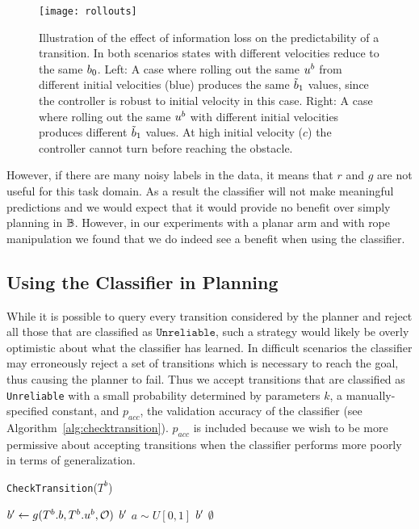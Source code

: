 \begin{figure}[h]
    \centering
    \texttt{[image: rollouts]}
    \caption{Illustration of the effect of information loss on the predictability of a transition. In both scenarios states with different velocities reduce to the same $b_0$. Left: A case where rolling out the same $u^b$ from different initial velocities (blue) produces the same $\tilde{b}_1$ values, since the controller is robust to initial velocity in this case. Right: A case where rolling out the same $u^b$ with different initial velocities produces different $\tilde{b}_1$ values. At high initial velocity ($c$) the controller cannot turn before reaching the obstacle.}
    \label{fig:cars}
\end{figure}

However, if there are many noisy labels in the data, it means that $r$ and $g$ are not useful for this task domain. As a result the classifier will not make meaningful predictions and we would expect that it would provide no benefit over simply planning in $\mathbb{B}$. However, in our experiments with a planar arm and with rope manipulation we found that we do indeed see a benefit when using the classifier.


\subsection{Using the Classifier in Planning}

While it is possible to query every transition considered by the planner and reject all those that are classified as $\texttt{Unreliable}$, such a strategy would likely be overly optimistic about what the classifier has learned. In difficult scenarios the classifier may erroneously reject a set of transitions which is necessary to reach the goal, thus causing the planner to fail. Thus we accept transitions that are classified as \texttt{Unreliable} with a small probability determined by parameters $k$, a manually-specified constant, and $p_{acc}$, the validation accuracy of the classifier (see  Algorithm~\ref{alg:checktransition}). $p_{acc}$ is included because we wish to be more permissive about accepting transitions when the classifier performs more poorly in terms of generalization.

\begin{algorithm}[h]
\caption{\strut \texttt{CheckTransition}($T^b$)}%
\begin{algorithmic}[1]
    \algtext*{EndIf}
    \State $b' \gets g(T^b.b,  T^b.u^b, \mathcal{O})$
    \If {\texttt{Classify}$(T^\reducedstate) ==$ \texttt{Reliable}}
        \State \Return $b'$
    \EndIf
    \State $a \sim U[0, 1]$
    \If {$a < e^{-k p_{\text{acc}}}$}
        \State \Return $b'$
    \EndIf
    \State \Return \texttt{$\emptyset$}
\end{algorithmic}
\label{alg:checktransition}
\end{algorithm}

